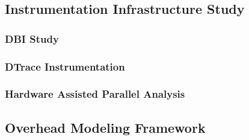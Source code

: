 \subsection{Instrumentation Infrastructure Study}
\subsubsection{DBI Study}
\subsubsection{DTrace Instrumentation}
\subsubsection{Hardware Assisted Parallel Analysis}
\subsection{Overhead Modeling Framework}
